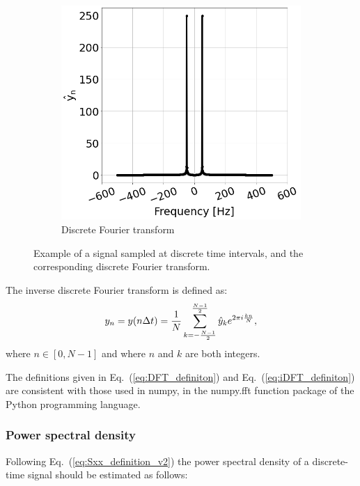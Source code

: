 \begin{figure}[!ht]
\begin{subfigure}[t]{0.45\textwidth}
        \includegraphics[width=1\textwidth]{./images/app_B/simple_signal_1freq_fft_example.png}
        \caption{Discrete Fourier transform}
        \label{fig:signal_and_DFT_example_b}
    \end{subfigure}
    \hfill
     \caption{Example of a signal sampled at discrete time intervals, and the corresponding discrete Fourier transform.}
     \label{fig:signal_and_DFT_example}
\end{figure}

The inverse discrete Fourier transform is defined as:
\begin{equation}\label{eq:iDFT_definiton}
 y_n =  y(n\Delta t) = \frac{1}{N} \sum_{k=-\frac{N-1}{2}}^{\frac{N-1}{2}} \hat{y}_k e^{2\pi {i} \frac{k n}{N}},
\end{equation}
where $n \in \left[0,N-1 \right ]$ and where $n$ and $k$ are both integers.

The definitions given in Eq.~(\ref{eq:DFT_definiton}) and Eq.~(\ref{eq:iDFT_definiton}) are consistent with those used in numpy, in the numpy.fft function \cite{numpy_fft} package of the Python programming language. 

\subsubsection*{Power spectral density} %
Following Eq.~(\ref{eq:Sxx_definition_v2}) the power spectral density of a discrete-time signal should be estimated as follows:

